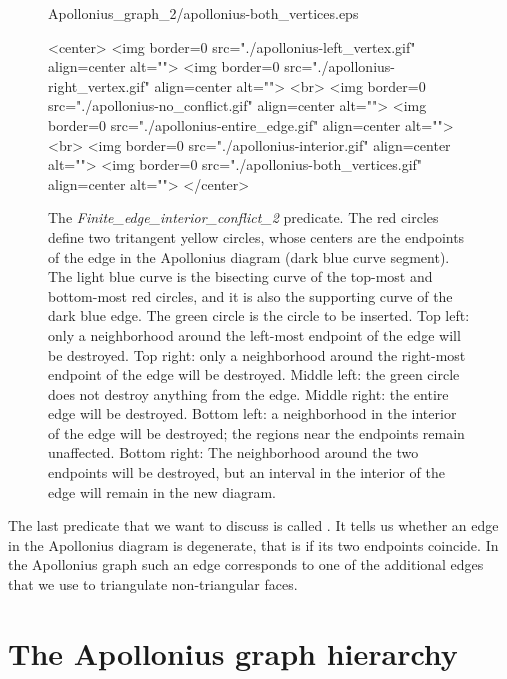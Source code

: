 \begin{figure}[!t]
\begin{ccTexOnly}
\begin{center}
{Apollonius_graph_2/apollonius-both_vertices.eps}\\
\end{center}
\end{ccTexOnly}
\caption{The {\em Finite\_edge\_interior\_conflict\_2} predicate. The red
  circles define two tritangent yellow circles, whose centers are
  the endpoints of the edge in the Apollonius diagram (dark blue curve
  segment). The light blue curve is the bisecting curve of the
  top-most and bottom-most red circles, and it is also the supporting
  curve of the dark blue edge. The green circle is the circle to be
  inserted. Top left: only a neighborhood around the left-most
  endpoint of the edge will be destroyed. Top right: only a
  neighborhood around the right-most endpoint of the edge will be
  destroyed. Middle left: the green circle does not destroy anything
  from the edge. Middle right: the entire edge will be
  destroyed. Bottom left: a neighborhood in the interior of the edge
  will be destroyed; the regions near the endpoints remain
  unaffected. Bottom right: The neighborhood around the two endpoints
  will be destroyed, but an interval in the interior of the edge will
  remain in the new diagram.\label{fig-ag2edgeconflict}}
\begin{ccHtmlOnly}
<center>
<img border=0 src="./apollonius-left_vertex.gif" align=center alt="">
<img border=0 src="./apollonius-right_vertex.gif" align=center alt="">
<br>
<img border=0 src="./apollonius-no_conflict.gif" align=center alt="">
<img border=0 src="./apollonius-entire_edge.gif" align=center alt="">
<br>
<img border=0 src="./apollonius-interior.gif" align=center alt="">
<img border=0 src="./apollonius-both_vertices.gif" align=center alt="">
</center>
\end{ccHtmlOnly}
\end{figure}


The last predicate that we want to discuss is called
. It tells us whether an edge in the
Apollonius diagram is degenerate, that is if its two endpoints
coincide. In the Apollonius graph such an edge corresponds to one of
the additional edges that we use to triangulate non-triangular faces.



\section{The Apollonius graph hierarchy}
\label{sec:ag2hierarchy}

